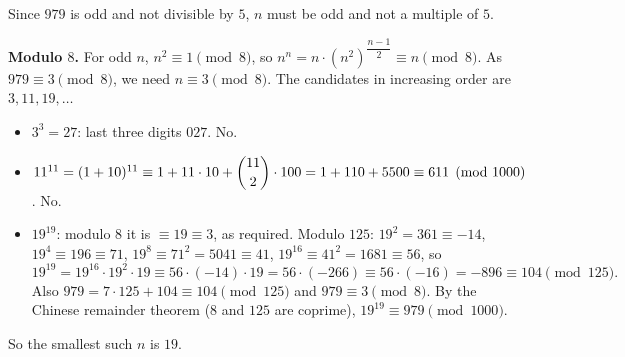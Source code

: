 Since $979$ is odd and not divisible by $5$, $n$ must be odd and not a multiple of $5$.

\textbf{Modulo $8$.} For odd $n$, $n^2\equiv1\pmod8$, so $n^n=n\cdot\left(n^2\right)^{\dfrac{n-1}{2}}\equiv n\pmod8$. As $979\equiv3\pmod8$, we need $n\equiv3\pmod8$. The candidates in increasing order are $3,11,19,\dots$
\begin{itemize}
\item $3^3=27$: last three digits $027$. No.
\item $11^{11}=(1+10)^{11}\equiv1+11\cdot10+\dbinom{11}{2}\cdot100=1+110+5500\equiv611\pmod{1000}$. No.
\item $19^{19}$: modulo $8$ it is $\equiv19\equiv3$, as required. Modulo $125$: $19^2=361\equiv-14$, $19^4\equiv196\equiv71$, $19^8\equiv71^2=5041\equiv41$, $19^{16}\equiv41^2=1681\equiv56$, so
\[
19^{19}=19^{16}\cdot19^2\cdot19\equiv56\cdot(-14)\cdot19=56\cdot(-266)\equiv56\cdot(-16)=-896\equiv104\pmod{125}.
\]
Also $979=7\cdot125+104\equiv104\pmod{125}$ and $979\equiv3\pmod 8$. By the Chinese remainder theorem ($8$ and $125$ are coprime), $19^{19}\equiv979\pmod{1000}$.
\end{itemize}
So the smallest such $n$ is $\boxed{19}$.

